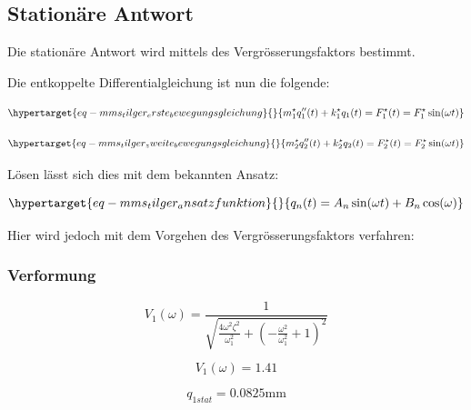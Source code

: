 \documentclass[
  letterpaper,
  DIV=11]{scrreprt}
\begin{document}
\hypertarget{stationuxe4re-antwort-2}{%
\subsection{Stationäre Antwort}\label{stationuxe4re-antwort-2}}

Die stationäre Antwort wird mittels des Vergrösserungsfaktors bestimmt.

Die entkoppelte Differentialgleichung ist nun die folgende:

\begin{equation}\protect\hypertarget{eq-mms_tilger_erste_bewegungsgleichung}{}{
m^\star_1 q_1''(t) + k^\star_1 q_1(t) = F^\star_1(t) = F^\star_1 \sin(\omega t)
}\label{eq-mms_tilger_erste_bewegungsgleichung}\end{equation}

\begin{equation}\protect\hypertarget{eq-mms_tilger_zweite_bewegungsgleichung}{}{
m^\star_2 q_2''(t) + k^\star_2 q_2(t) = F^\star_2(t) = F^\star_2 \sin(\omega t)
}\label{eq-mms_tilger_zweite_bewegungsgleichung}\end{equation}

Lösen lässt sich dies mit dem bekannten Ansatz:

\begin{equation}\protect\hypertarget{eq-mms_tilger_ansatzfunktion}{}{
q_n(t) = A_n \sin(\omega t) + B_n \cos(\omega)
}\label{eq-mms_tilger_ansatzfunktion}\end{equation}

Hier wird jedoch mit dem Vorgehen des Vergrösserungsfaktors verfahren:

\hypertarget{verformung}{%
\subsubsection{Verformung}\label{verformung}}

\begin{equation}V_{1}{\left(\omega \right)} = \frac{1}{\sqrt{\frac{4 \omega^{2} \zeta_{}^{2}}{\omega_{1}^{2}} + \left(- \frac{\omega^{2}}{\omega_{1}^{2}} + 1\right)^{2}}}\end{equation}

\begin{equation}V_{1}{\left(\omega \right)} = 1.41\end{equation}

\begin{equation}q_{1 stat} = 0.0825 \text{mm}\end{equation}
\end{document}
